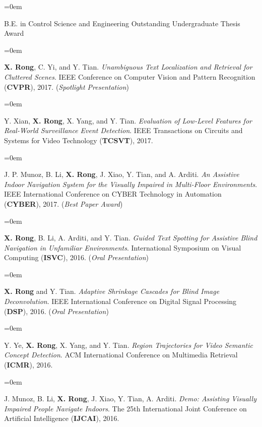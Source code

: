 \documentclass{scrartcl}
\newcommand{\Description}[1]{\hangindent=0em\hangafter=0\noindent\raggedright\footnotesize{#1}\par\normalsize\vspace{1em}} %
\begin{document}
\begin{cv}{}
\Description{B.E. in Control Science and Engineering \qquad Outstanding Undergraduate Thesis Award}

\vspace{2.0em} %


\noindent{}\vspace{0.8em}

\Description{\textbf{X. Rong}, C. Yi, and Y. Tian. \textit{Unambiguous Text Localization and Retrieval for Cluttered Scenes}. IEEE Conference on Computer Vision and Pattern Recognition (\textbf{CVPR}), 2017. (\textit{Spotlight Presentation})}

\Description{Y. Xian, \textbf{X. Rong}, X. Yang, and Y. Tian. \textit{Evaluation of Low-Level Features for Real-World Surveillance Event Detection}. IEEE Transactions on Circuits and Systems for Video Technology (\textbf{TCSVT}), 2017.}

\Description{J. P. Munoz, B. Li, \textbf{X. Rong}, J. Xiao, Y. Tian, and A. Arditi. \textit{An Assistive Indoor Navigation System for the Visually Impaired in Multi-Floor Environments}. IEEE International Conference on CYBER Technology in Automation (\textbf{CYBER}), 2017. (\textit{Best Paper Award})}

\Description{\textbf{X. Rong}, B. Li, A. Arditi, and Y. Tian. \textit{Guided Text Spotting for Assistive Blind Navigation in Unfamiliar Environments}. International Symposium on Visual Computing (\textbf{ISVC}), 2016. (\textit{Oral Presentation})}

\Description{\textbf{X. Rong} and Y. Tian. \textit{Adaptive Shrinkage Cascades for Blind Image Deconvolution}. IEEE International Conference on Digital Signal Processing (\textbf{DSP}), 2016. (\textit{Oral Presentation})}

\Description{Y. Ye, \textbf{X. Rong}, X. Yang, and Y. Tian. \textit{Region Trajectories for Video Semantic Concept Detection}. ACM International Conference on Multimedia Retrieval (\textbf{ICMR}), 2016.}

\Description{J. Munoz, B. Li, \textbf{X. Rong}, J. Xiao, Y. Tian, A. Arditi. \textit{Demo: Assisting Visually Impaired People Navigate Indoors}. The 25th International Joint Conference on Artificial Intelligence (\textbf{IJCAI}), 2016.}


\end{cv}
\end{document}
